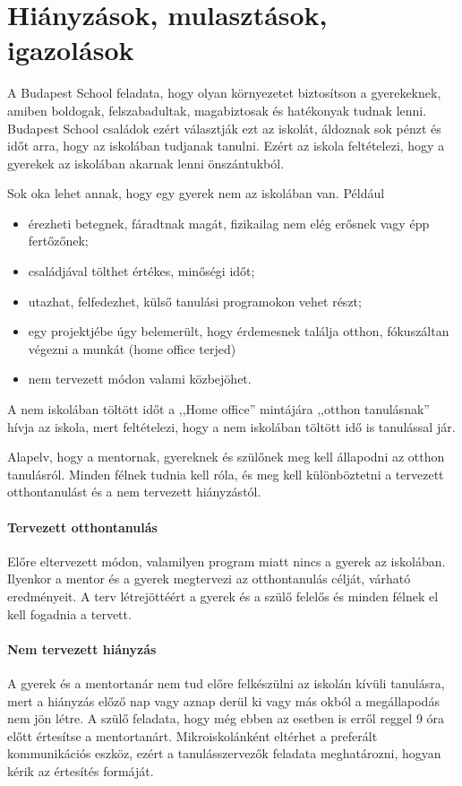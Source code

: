 \section{Hiányzások, mulasztások, igazolások}
A Budapest School feladata, hogy olyan környezetet biztosítson a gyerekeknek, amiben boldogak, felszabadultak, magabiztosak és hatékonyak tudnak lenni. Budapest School családok ezért választják ezt az iskolát, áldoznak sok pénzt és időt arra, hogy az iskolában tudjanak tanulni. Ezért az iskola feltételezi, hogy a gyerekek az iskolában akarnak lenni önszántukból.

Sok oka lehet annak, hogy egy gyerek nem az iskolában van. Például
\begin{itemize}
    \item érezheti betegnek, fáradtnak magát, fizikailag nem elég erősnek vagy épp fertőzőnek;
    \item családjával tölthet értékes, minőségi időt;
    \item utazhat, felfedezhet, külső tanulási programokon vehet részt;
    \item egy projektjébe úgy belemerült, hogy érdemesnek találja otthon, fókuszáltan végezni a munkát (home office terjed) \item nem tervezett módon valami közbejöhet.
\end{itemize}

A nem iskolában töltött időt a ,,Home office'' mintájára ,,otthon tanulásnak'' hívja az iskola, mert feltételezi, hogy a nem iskolában töltött idő is tanulással jár.

Alapelv, hogy a mentornak, gyereknek és szülőnek meg kell állapodni az otthon tanulásról. Minden félnek tudnia kell róla, és meg kell különböztetni a tervezett otthontanulást és a nem tervezett hiányzástól.

\paragraph{Tervezett otthontanulás} Előre eltervezett módon, valamilyen program miatt nincs a gyerek az iskolában. Ilyenkor a mentor és a gyerek megtervezi az otthontanulás célját, várható eredményeit. A terv létrejöttéért a gyerek és a szülő felelős és minden félnek el kell fogadnia a tervett.

\paragraph{Nem tervezett hiányzás} A gyerek és a mentortanár nem tud előre felkészülni az iskolán kívüli tanulásra, mert a hiányzás előző nap vagy aznap derül ki vagy más okból a megállapodás nem jön létre. A szülő feladata, hogy még ebben az esetben is erről reggel 9 óra előtt értesítse a mentortanárt. Mikroiskolánként eltérhet a preferált kommunikációs eszköz, ezért a tanulásszervezők feladata meghatározni, hogyan kérik az értesítés formáját.


